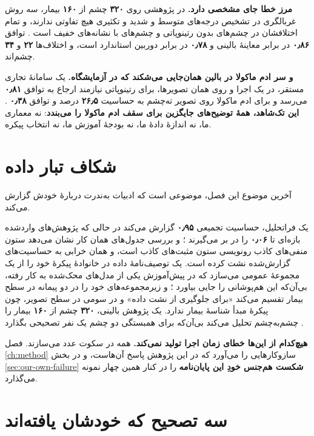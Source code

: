 \textbf{مرز خطا جای مشخصی دارد.} در پژوهشی روی \textbf{\num{۳۲۰}} چشم از \textbf{\num{۱۶۰}} بیمار، سه
روش غربالگری در تشخیص درجه‌های متوسط و شدید و تکثیری هیچ تفاوتی ندارند، و تمام اختلافشان در
چشم‌های بدون رتینوپاتی و چشم‌های با نشانه‌های خفیف است \cite{tomic2024handheld}. توافق
\textbf{\num{۰٫۸۶}} در برابر معاینهٔ بالینی و \textbf{\num{۰٫۷۸}} در برابر دوربین استاندارد است، و
اختلاف‌ها \textbf{\num{۲۲}} و \textbf{\num{۳۴}} چشم‌اند.

\textbf{و سر ادم ماکولا در بالین همان‌جایی می‌شکند که در آزمایشگاه.} یک سامانهٔ تجاری مستقر،
در یک اجرا و روی همان تصویرها، برای رتینوپاتی نیازمند ارجاع به توافق \textbf{\num{۰٫۸۱}} می‌رسد و
برای ادم ماکولا روی تصویر ته‌چشم به حساسیت \textbf{\num{۲۶٫۵}} درصد و توافق \textbf{\num{۰٫۳۸}}
\cite{duggal2025realworld}. \textbf{این تک‌شاهد، همهٔ توضیح‌های جایگزین برای سقف ادم ماکولا را
می‌بندد}: نه معماری ما، نه اندازهٔ دادهٔ ما، نه بودجهٔ آموزش ما، نه انتخاب پیکره.

\section{شکاف تبار داده}
\label{sec:lit-provenance}

آخرین موضوع این فصل، موضوعی است که ادبیات به‌ندرت دربارهٔ خودش گزارش می‌کند.

یک فراتحلیل، حساسیت تجمیعی \textbf{\num{۰٫۹۵}} گزارش می‌کند در حالی که پژوهش‌های واردشده بازه‌ای
تا \textbf{\num{۰٫۰۶}} را در بر می‌گیرند \cite{tahir2025meta}؛ و بررسی جدول‌های همان کار نشان
می‌دهد ستون منفی‌های کاذب رونویسی ستون مثبت‌های کاذب است، و همان خرابی به حساسیت‌های
گزارش‌شده نشت کرده است. یک توصیف‌نامهٔ داده در خانوادهٔ  پیکرهٔ خود را از یک
مجموعهٔ عمومی می‌سازد که در پیش‌آموزش یکی از مدل‌های محک‌شده به کار رفته، بی‌آن‌که این
هم‌پوشانی را جایی بیاورد \cite{tang2026mmrdr}؛ و زیرمجموعه‌های خود را در دو پیمانه در سطح
بیمار تقسیم می‌کند «برای جلوگیری از نشت داده» و در سومی در سطح تصویر، چون پیکرهٔ مبدأ شناسهٔ
بیمار ندارد. یک پژوهش بالینی، \textbf{\num{۳۲۰}} چشم از \textbf{\num{۱۶۰}} بیمار را چشم‌به‌چشم تحلیل
می‌کند بی‌آن‌که برای همبستگی دو چشم یک نفر تصحیحی بگذارد \cite{tomic2024handheld}.

\textbf{هیچ‌کدام از این‌ها خطای زمان اجرا تولید نمی‌کند.} همه در سکوت عدد می‌سازند. فصل
\ref{ch:method} سازوکارهایی را می‌آورد که در این پژوهش پاسخ آن‌هاست، و در بخش
\ref{sec:our-own-failure} \textbf{شکست هم‌جنس خودِ این پایان‌نامه} را در کنار همین چهار نمونه
می‌گذارد.

\section{سه تصحیح که خودشان یافته‌اند}
\label{sec:lit-corrections}

